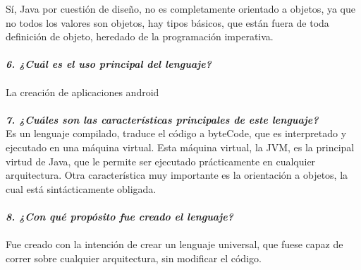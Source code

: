 \documentclass{article}
\begin{document}
Sí, Java por cuestión de diseño, no es completamente orientado a objetos, ya que no todos los valores son objetos, hay tipos básicos, que están fuera de toda definición de objeto, heredado de la programación imperativa.\\\\
\textbf{\textit{6. ¿Cuál es el uso principal del lenguaje?}}
\\\\
La creación de aplicaciones android\\\\
\textbf{\textit{7. ¿Cuáles son las características principales de este lenguaje?}}\\
Es un lenguaje compilado, traduce el código a byteCode, que es interpretado y ejecutado en una máquina virtual. Esta máquina virtual, la JVM, es la principal virtud de Java, que le permite ser ejecutado prácticamente en cualquier arquitectura. Otra característica muy importante es la orientación a objetos, la cual está sintácticamente obligada.\\\\
\textbf{\textit{8. ¿Con qué propósito fue creado el lenguaje?}}
\\\\
Fue creado con la intención de crear un lenguaje universal, que fuese capaz de correr sobre cualquier arquitectura, sin modificar el código.
\\\\
\end{document}
